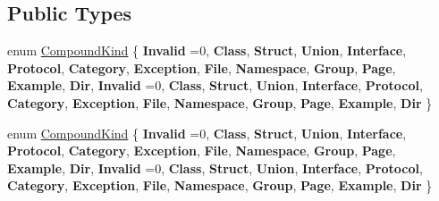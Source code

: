 \subsection*{Public Types}
\begin{DoxyCompactItemize}
\item 
enum \mbox{\hyperlink{class_i_compound_a6b86be2ca9f6759434c1dd8405be328a}{Compound\+Kind}} \{ \newline
{\bfseries Invalid} =0, 
{\bfseries Class}, 
{\bfseries Struct}, 
{\bfseries Union}, 
\newline
{\bfseries Interface}, 
{\bfseries Protocol}, 
{\bfseries Category}, 
{\bfseries Exception}, 
\newline
{\bfseries File}, 
{\bfseries Namespace}, 
{\bfseries Group}, 
{\bfseries Page}, 
\newline
{\bfseries Example}, 
{\bfseries Dir}, 
{\bfseries Invalid} =0, 
{\bfseries Class}, 
\newline
{\bfseries Struct}, 
{\bfseries Union}, 
{\bfseries Interface}, 
{\bfseries Protocol}, 
\newline
{\bfseries Category}, 
{\bfseries Exception}, 
{\bfseries File}, 
{\bfseries Namespace}, 
\newline
{\bfseries Group}, 
{\bfseries Page}, 
{\bfseries Example}, 
{\bfseries Dir}
 \}
\item 
enum \mbox{\hyperlink{class_i_compound_a6b86be2ca9f6759434c1dd8405be328a}{Compound\+Kind}} \{ \newline
{\bfseries Invalid} =0, 
{\bfseries Class}, 
{\bfseries Struct}, 
{\bfseries Union}, 
\newline
{\bfseries Interface}, 
{\bfseries Protocol}, 
{\bfseries Category}, 
{\bfseries Exception}, 
\newline
{\bfseries File}, 
{\bfseries Namespace}, 
{\bfseries Group}, 
{\bfseries Page}, 
\newline
{\bfseries Example}, 
{\bfseries Dir}, 
{\bfseries Invalid} =0, 
{\bfseries Class}, 
\newline
{\bfseries Struct}, 
{\bfseries Union}, 
{\bfseries Interface}, 
{\bfseries Protocol}, 
\newline
{\bfseries Category}, 
{\bfseries Exception}, 
{\bfseries File}, 
{\bfseries Namespace}, 
\newline
{\bfseries Group}, 
{\bfseries Page}, 
{\bfseries Example}, 
{\bfseries Dir}
 \}
\end{DoxyCompactItemize}
